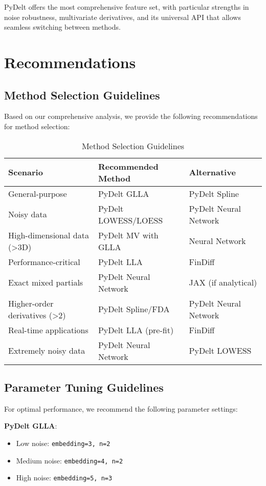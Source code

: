 \documentclass[conference]{IEEEtran}
\begin{document}
PyDelt offers the most comprehensive feature set, with particular strengths in noise robustness, multivariate derivatives, and its universal API that allows seamless switching between methods.

\section{Recommendations}

\subsection{Method Selection Guidelines}

Based on our comprehensive analysis, we provide the following recommendations for method selection:

\begin{table}[!t]
\caption{Method Selection Guidelines}
\label{tab:method_selection}
\centering
\begin{tabular}{lll}
\toprule
\textbf{Scenario} & \textbf{Recommended Method} & \textbf{Alternative} \\
\midrule
General-purpose & PyDelt GLLA & PyDelt Spline \\
Noisy data & PyDelt LOWESS/LOESS & PyDelt Neural Network \\
High-dimensional data (>3D) & PyDelt MV with GLLA & Neural Network \\
Performance-critical & PyDelt LLA & FinDiff \\
Exact mixed partials & PyDelt Neural Network & JAX (if analytical) \\
Higher-order derivatives (>2) & PyDelt Spline/FDA & PyDelt Neural Network \\
Real-time applications & PyDelt LLA (pre-fit) & FinDiff \\
Extremely noisy data & PyDelt Neural Network & PyDelt LOWESS \\
\bottomrule
\end{tabular}
\end{table}

\subsection{Parameter Tuning Guidelines}

For optimal performance, we recommend the following parameter settings:

\textbf{PyDelt GLLA}:
\begin{itemize}
\item Low noise: \texttt{embedding=3, n=2}
\item Medium noise: \texttt{embedding=4, n=2}
\item High noise: \texttt{embedding=5, n=3}
\end{itemize}
\end{document}
